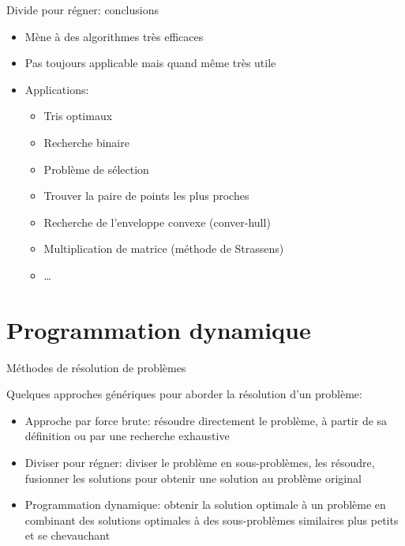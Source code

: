\begin{frame}{Divide pour régner: conclusions}

\begin{itemize}
\item Mène à des algorithmes très efficaces
\item Pas toujours applicable mais quand même très utile

\bigskip

\item Applications:
\begin{itemize}
\item Tris optimaux
\item Recherche binaire
\item Problème de sélection
\item Trouver la paire de points les plus proches
\item Recherche de l'enveloppe convexe (conver-hull)
\item Multiplication de matrice (méthode de Strassens)
\item \ldots
\end{itemize}
\end{itemize}

\end{frame}

\section{Programmation dynamique}

\begin{frame}{Méthodes de résolution de problèmes}

Quelques approches génériques pour aborder la résolution d'un problème:
\begin{itemize}
\item \alert{Approche par force brute:} résoudre directement le problème, à partir de sa définition ou par une recherche exhaustive
\item \alert{Diviser pour régner:} diviser le problème en sous-problèmes, les résoudre, fusionner les solutions pour obtenir une solution au problème original
\item \alert{Programmation dynamique:} obtenir la solution optimale à un problème en combinant des solutions optimales à des sous-problèmes similaires plus petits et se chevauchant
\end{itemize}

\end{frame}

